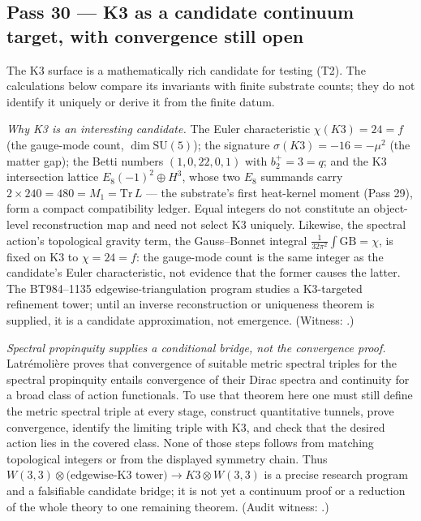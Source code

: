 \documentclass[11pt]{article}
\begin{document}
\subsection{Pass 30 --- K3 as a candidate continuum target, with convergence still open}
\label{sec:capstone-thirty}

The K3 surface is a mathematically rich candidate for testing (T2).  The calculations below
compare its invariants with finite substrate counts; they do not identify it uniquely or derive
it from the finite datum.

\emph{Why K3 is an interesting candidate.} The Euler characteristic
$\chi(K3)=24=f$ (the gauge-mode count, $\dim\mathrm{SU}(5)$); the signature $\sigma(K3)=-16=-\mu^2$
(the matter gap); the Betti numbers $(1,0,22,0,1)$ with $b_2^+=3=q$; and the K3 intersection lattice
$E_8(-1)^2\oplus H^3$, whose two $E_8$ summands carry $2\times240=480=M_1=\mathrm{Tr}\,L$ --- the
substrate's first heat-kernel moment (Pass 29), form a compact compatibility ledger.  Equal integers
do not constitute an object-level reconstruction map and need not select K3 uniquely.  Likewise,
the spectral action's topological gravity term, the Gauss--Bonnet integral
$\tfrac1{32\pi^2}\!\int\!\mathrm{GB}=\chi$, is fixed on K3 to $\chi=24=f$: the gauge-mode count is the
same integer as the candidate's Euler characteristic, not evidence that the former causes the
latter.  The BT984--1135 edgewise-triangulation program studies a K3-targeted refinement tower;
until an inverse reconstruction or uniqueness theorem is supplied, it is a candidate
approximation, not emergence. (Witness: .)

\emph{Spectral propinquity supplies a conditional bridge, not the convergence proof.}
Latr\'emoli\`ere proves that convergence of suitable metric spectral triples for the spectral
propinquity entails convergence of their Dirac spectra and continuity for a broad class of action
functionals.  To use that theorem here one must still define the metric spectral triple at every
stage, construct quantitative tunnels, prove convergence, identify the limiting triple with K3,
and check that the desired action lies in the covered class.  None of those steps follows from
matching topological integers or from the displayed symmetry chain.  Thus
$W(3,3)\otimes\text{(edgewise-K3 tower)}\to K3\otimes W(3,3)$ is a precise research program and a
falsifiable candidate bridge; it is not yet a continuum proof or a reduction of the whole theory
to one remaining theorem. (Audit witness: .)
\end{document}
